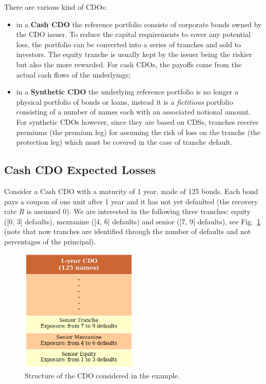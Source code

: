 There are various kind of CDOs:
\begin{itemize}
	\item in a \textbf{Cash CDO} the reference portfolio consists of corporate bonds owned by the CDO issuer. To reduce the capital requirements to cover any potential loss,  the portfolio can be converted into a series of tranches and sold to investors. The equity tranche is usually kept by the issuer being the riskier but also the more rewarded. For cash CDOs, the payoffs come from the actual cash flows of the underlyings;
	\item in a \textbf{Synthetic CDO} the underlying reference portfolio is no longer a physical portfolio of bonds or loans, instead it is a \emph{fictitious} portfolio consisting of a number of names each with an associated notional amount. For
	synthetic CDOs however, since they are based on CDSs, tranches receive premiums (the
	premium leg) for assuming the risk of loss on the tranche (the protection leg) which
	must be covered in the case of tranche default.
\end{itemize}

\subsection{Cash CDO Expected Losses}\label{sec:expected_losses}

Consider a Cash CDO with a maturity of 1 year, made of 125 bonds. Each bond pays a coupon of one unit after 1 year and it has not yet defaulted (the recovery rate $R$ is assumed 0). We are interested in the following three tranches: equity ([0, 3] defaults), mezzanine ([4, 6] defaults) and senior ([7, 9] defaults), see Fig.~\ref{fig:cdo_ex_1} (note that now tranches are identified through the number of defaults and not percentages of the principal). 

\begin{figure}[htb]
	\centering
	\includegraphics[width=0.5\textwidth]{figures/ex_cdo_1}
	\caption{Structure of the CDO considered in the example.}
	\label{fig:cdo_ex_1}
\end{figure}

